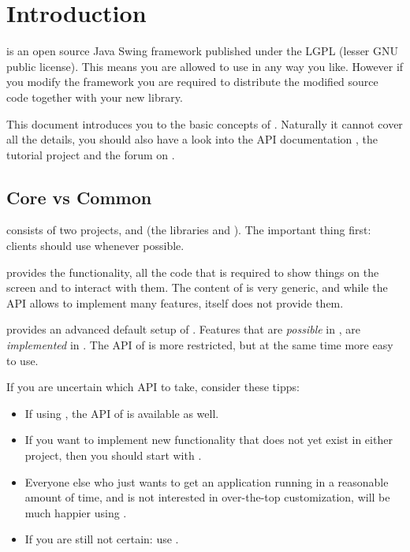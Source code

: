 \section{Introduction}
 is an open source Java Swing framework published under the LGPL (lesser GNU public license). This means you are allowed to use \linebreak {} in any way you like. However if you modify the framework you are required to distribute the modified source code together with your new library.

This document introduces you to the basic concepts of . Naturally it cannot cover all the details, you should also have a look into the API documentation , the tutorial project and the forum on .

\subsection{Core vs Common}
 consists of two projects,  and  (the libraries \linebreak {} and ). The important thing first: clients should use  whenever possible.

 provides the functionality, all the code that is required to show things on the screen and to interact with them. The content of  is very generic, and while the API allows to implement many features,  itself does not provide them.

 provides an advanced default setup of . Features that are \emph{possible} in , are \emph{implemented} in . The API of  is more restricted, but at the same time more easy to use.

If you are uncertain which API to take, consider these tipps:
\begin{itemize}
 \item If using , the API of  is available as well.
 \item If you want to implement new functionality that does not yet exist in either project, then you should start with .
 \item Everyone else who just wants to get an application running in a reasonable amount of time, and is not interested in over-the-top customization, will be much happier using .
 \item If you are still not certain: use .
\end{itemize}


